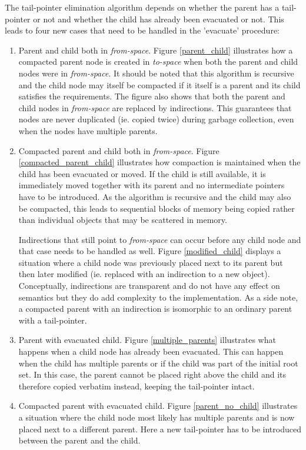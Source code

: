 \documentclass[a4paper,oneside]{memoir}
\begin{document}
The tail-pointer elimination algorithm depends on whether the parent has a
tail-pointer or not and whether the child has already been evacuated or not. This
leads to four new cases that need to be handled in the 'evacuate' procedure:
\begin{enumerate}
  \item Parent and child both in \emph{from-space}. Figure \ref{parent_child}
    illustrates
    how a compacted parent node is created in \emph{to-space} when both the parent
    and child nodes were in \emph{from-space}. It should be noted that this
    algorithm is recursive and the child node may itself be compacted if it
    itself is a parent and its child satisfies the requirements. The figure also
    shows that both the parent and child nodes in \emph{from-space} are replaced
    by indirections. This guarantees that nodes are never duplicated (ie. copied
    twice) during garbage collection, even when the nodes have multiple parents.

  \item Compacted parent and child both in \emph{from-space}. Figure
    \ref{compacted_parent_child} illustrates how compaction is maintained when
    the child has been evacuated or moved. If the child is still available, it
    is immediately moved together with its parent and no intermediate pointers
    have to be introduced. As the algorithm is recursive and the child may also
    be compacted, this leads to sequential blocks of memory being copied rather
    than individual objects that may be scattered in memory.

    Indirections that still point to \emph{from-space} can occur before any
    child node and that case needs to be handled as well. Figure
    \ref{modified_child} displays a situation where a child node was previously
    placed next to its parent but then later modified (ie. replaced with an
    indirection to a new object). Conceptually, indirections are transparent
    and do not have any effect on semantics but they do add complexity to the
    implementation. As a side note, a compacted parent with an indirection is
    isomorphic to an ordinary parent with a tail-pointer.
  \item Parent with evacuated child. Figure \ref{multiple_parents} illustrates
    what happens when a child node has already been evacuated. This can happen
    when the child has multiple parents or if the child was part of the initial
    root set. In this case, the parent cannot be placed right above the child
    and its therefore copied verbatim instead, keeping the tail-pointer intact.
  \item Compacted parent with evacuated child. Figure \ref{parent_no_child}
    illustrates a situation where the child node most likely has multiple parents
    and is now placed next to a different parent. Here a new tail-pointer has to
    be introduced between the parent and the child.
\end{enumerate}
\end{document}
